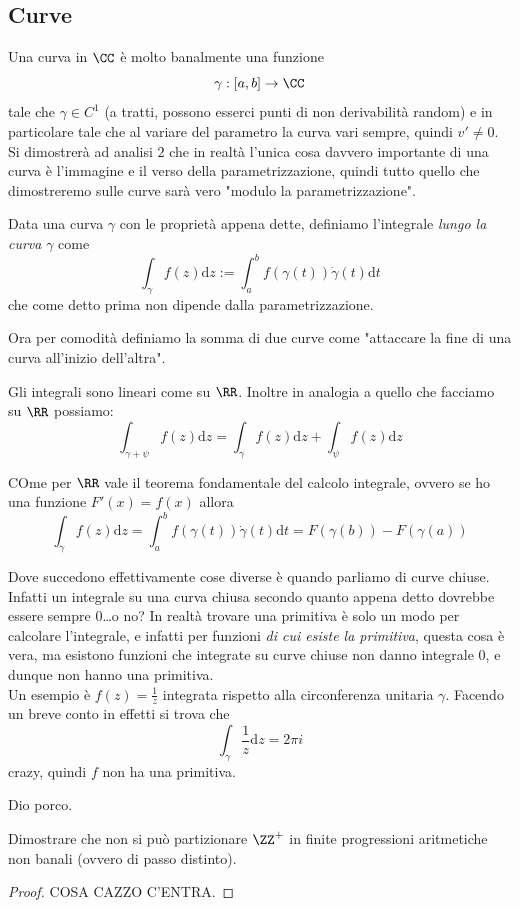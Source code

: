 \documentclass[11pt]{scrartcl}
\begin{document}
	\subsection{Curve}
	Una curva in $\CC$ è molto banalmente una funzione 
	$$\gamma:[a,b]\to \CC$$
	tale che $\gamma\in C^1$ (a tratti, possono esserci punti di non derivabilità random) e in particolare tale che al variare del parametro la curva vari sempre, quindi $v'\ne 0$. Si dimostrerà ad analisi $2$ che in realtà l'unica cosa davvero importante di una curva è l'immagine e il verso della parametrizzazione, quindi tutto quello che dimostreremo sulle curve sarà vero "modulo la parametrizzazione". 
	\begin{definition}
		Data una curva $\gamma$ con le proprietà appena dette, definiamo l'integrale \textit{lungo la curva} $\gamma$ come
		$$\int_\gamma f(z)\text{d}z:=\int_a^bf(\gamma(t))\dot{\gamma}(t)\text{d}t$$
		che come detto prima non dipende dalla parametrizzazione.
	\end{definition} 
	Ora per comodità definiamo la somma di due curve come "attaccare la fine di una curva all'inizio dell'altra". 
	\begin{lemma}
		Gli integrali sono lineari come su $\RR$. Inoltre in analogia a quello che facciamo su $\RR$ possiamo:
		$$\int_{\gamma+\psi}f(z)\text{d}z=\int_\gamma f(z)\text{d}z+\int_\psi f(z)\text{d}z$$
	\end{lemma}
	\begin{theorem}
		COme per $\RR$ vale il teorema fondamentale del calcolo integrale, ovvero se ho una funzione $F'(x)=f(x)$ allora 
		$$\int_\gamma f(z)\text{d}z=\int_{a}^{b}f(\gamma(t))\dot{\gamma}(t)\text{d}t=F(\gamma(b))-F(\gamma(a))$$
	\end{theorem}
	Dove succedono effettivamente cose diverse è quando parliamo di curve chiuse. Infatti un integrale su una curva chiusa secondo quanto appena detto dovrebbe essere sempre $0$\dots o no? In realtà trovare una primitiva è solo un modo per calcolare l'integrale, e infatti per funzioni \textit{di cui esiste la primitiva}, questa cosa è vera, ma esistono funzioni che integrate su curve chiuse non danno integrale $0$, e dunque non hanno una primitiva. \\
	Un esempio è $f(z)=\frac{1}{z}$ integrata rispetto alla circonferenza unitaria $\gamma$. Facendo un breve conto in effetti si trova che
	$$\int_\gamma \frac{1}{z}\text{d}z=2\pi i$$
	crazy, quindi $f$ non ha una primitiva.
	\begin{theorem}[Goursat]
		Dio porco.
	\end{theorem} 
	\begin{exercise}
		Dimostrare che non si può partizionare $\ZZ^+$ in finite progressioni aritmetiche non banali (ovvero di passo distinto).
	\end{exercise}
	\begin{proof}
		COSA CAZZO C'ENTRA. 
	\end{proof}
\end{document}
